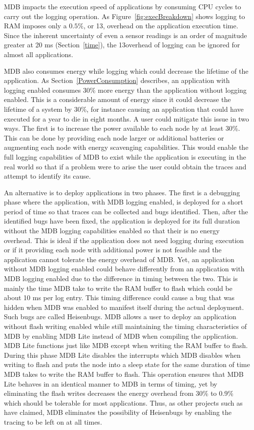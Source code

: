 MDB impacts the execution speed of applications by consuming CPU cycles to carry
out the logging operation. As Figure~\ref{fig:execBreakdown} shows logging to
RAM imposes only a $0.5\%$, or 13\us, overhead on the application execution
time. Since the inherent uncertainty of even a sensor readings is an order of
magnitude greater at 20 ms (Section~\ref{time}), the 13\us overhead of logging
can be ignored for almost all applications.

MDB also consumes energy while logging which could decrease the lifetime of the
application. As Section~\ref{PowerConsumption} describes, an application with
logging enabled consumes 30\% more energy than the application without logging
enabled. This is a considerable amount of energy since it could decrease the
lifetime of a system by 30\%, for instance causing an application that could
have executed for a year to die in eight months. A user could mitigate this
issue in two ways. The first is to increase the power available to each node by
at least 30\%. This can be done by providing each node larger or additional
batteries or augmenting each node with energy scavenging capabilities. This
would enable the full logging capabilities of MDB to exist while the application
is executing in the real world so that if a problem were to arise the user could
obtain the traces and attempt to identify its cause. 

An alternative is to deploy applications in two phases. The first is a debugging
phase where the application, with MDB logging enabled, is deployed for a short
period of time so that traces can be collected and bugs identified. Then, after
the identified bugs have been fixed, the application is deployed for its full
duration without the MDB logging capabilities enabled so that their is no energy
overhead. This is ideal if the application does not need logging during
execution or if it providing each node with additional power is not feasible and
the application cannot tolerate the energy overhead of MDB. Yet, an application
without MDB logging enabled could behave differently from an application with
MDB logging enabled due to the difference in timing between the two. This is
mainly the time MDB take to write the RAM buffer to flash which could be about
10 ms per log entry. This timing difference could cause a bug that was hidden
when MDB was enabled to manifest itself during the actual deployment. Such bugs
are called Heisenbugs. MDB allows a user to deploy an application without flash
writing enabled while still maintaining the timing characteristics of MDB by
enabling MDB Lite instead of MDB when compiling the application. MDB Lite
functions just like MDB except when writing the RAM buffer to flash. During this
phase MDB Lite disables the interrupts which MDB disables when writing to flash
and puts the node into a sleep state for the same duration of time MDB takes to
write the RAM buffer to flash. This operation ensures that MDB Lite behaves in
an identical manner to MDB in terms of timing, yet by eliminating the flash
writes decreases the energy overhead from 30\% to 0.9\% which should be
tolerable for most applications. Thus, as other projects such
as~\cite{Ronsse2001} have claimed, MDB eliminates the possibility of Heisenbugs
by enabling the tracing to be left on at all times.

